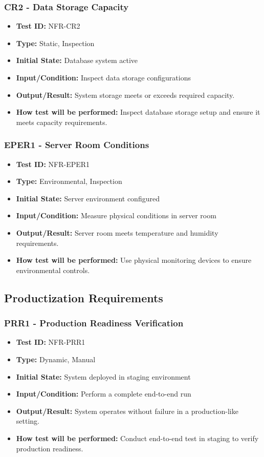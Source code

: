 \documentclass[12pt, titlepage]{article}
\begin{document}
\subsubsection{CR2 - Data Storage Capacity}
\begin{itemize}
    \item \textbf{Test ID:} NFR-CR2
    \item \textbf{Type:} Static, Inspection
    \item \textbf{Initial State:} Database system active
    \item \textbf{Input/Condition:} Inspect data storage configurations
    \item \textbf{Output/Result:} System storage meets or exceeds required capacity.
    \item \textbf{How test will be performed:} Inspect database storage setup and ensure it meets capacity requirements.
\end{itemize}

\subsubsection{EPER1 - Server Room Conditions}
\begin{itemize}
    \item \textbf{Test ID:} NFR-EPER1
    \item \textbf{Type:} Environmental, Inspection
    \item \textbf{Initial State:} Server environment configured
    \item \textbf{Input/Condition:} Measure physical conditions in server room
    \item \textbf{Output/Result:} Server room meets temperature and humidity requirements.
    \item \textbf{How test will be performed:} Use physical monitoring devices to ensure environmental controls.
\end{itemize}

\subsection{Productization Requirements}

\subsubsection{PRR1 - Production Readiness Verification}
\begin{itemize}
    \item \textbf{Test ID:} NFR-PRR1
    \item \textbf{Type:} Dynamic, Manual
    \item \textbf{Initial State:} System deployed in staging environment
    \item \textbf{Input/Condition:} Perform a complete end-to-end run
    \item \textbf{Output/Result:} System operates without failure in a production-like setting.
    \item \textbf{How test will be performed:} Conduct end-to-end test in staging to verify production readiness.
\end{itemize}
\end{document}
